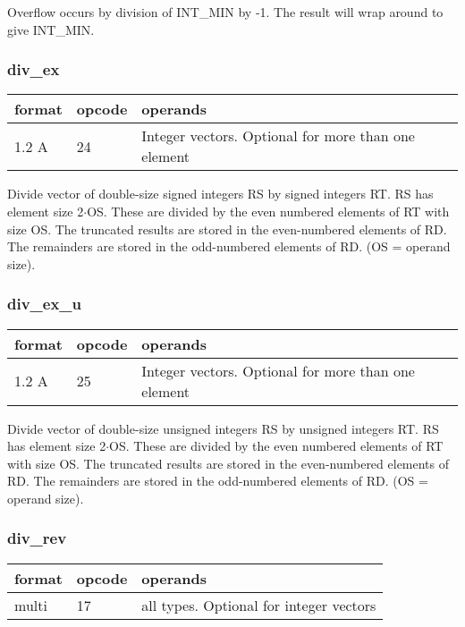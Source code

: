 \documentclass[forwardcom.tex]{subfiles}
\begin{document}
Overflow occurs by division of INT\_MIN by -1. The result will wrap around to give INT\_MIN.

\subsubsection{div\_ex}
\label{table:divExInstruction}
\begin{tabular}{|p{12mm}|p{12mm}|p{110mm}|}
\hline
\bfseries format & \bfseries opcode & \bfseries operands \\ \hline
1.2 A & 24 & Integer vectors. Optional for more than one element \\ \hline
\end{tabular}
\vspace{2mm}

Divide vector of double-size signed integers RS by signed integers RT. RS has element size 2$\cdot$OS. These are divided by the even numbered
elements of RT with size OS. The truncated results are stored in the even-numbered elements of RD. The remainders are stored in the odd-numbered elements of RD.
(OS = operand size).

\subsubsection{div\_ex\_u}
\label{table:divExUInstruction}
\begin{tabular}{|p{12mm}|p{12mm}|p{110mm}|}
\hline
\bfseries format & \bfseries opcode & \bfseries operands \\ \hline
1.2 A & 25 & Integer vectors. Optional for more than one element \\ \hline
\end{tabular}
\vspace{2mm}

Divide vector of double-size unsigned integers RS by unsigned integers RT. RS has element size 2$\cdot$OS. These are divided by the even numbered elements of RT with size OS. The truncated results are stored in the even-numbered elements of RD. The remainders are stored in the odd-numbered elements of RD.
(OS = operand size).

\subsubsection{div\_rev}
\label{table:divRevInstruction}
\begin{tabular}{|p{12mm}|p{12mm}|p{110mm}|}
\hline
\bfseries format & \bfseries opcode & \bfseries operands \\ \hline
multi & 17 & all types. Optional for integer vectors \\ \hline
\end{tabular}
\vspace{2mm}
\end{document}
